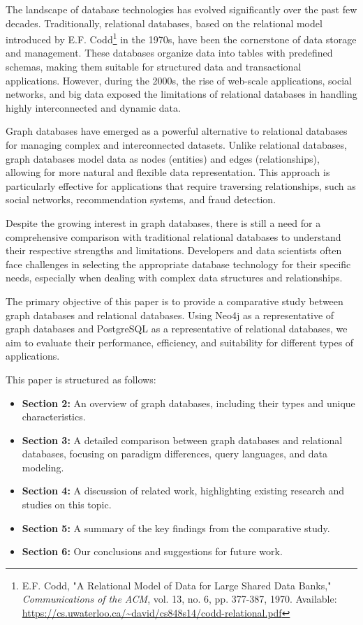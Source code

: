 The landscape of database technologies has evolved significantly over the past few decades. Traditionally, relational databases, based on the relational model introduced by E.F. Codd\footnote{E.F. Codd, "A Relational Model of Data for Large Shared Data Banks," \textit{Communications of the ACM}, vol. 13, no. 6, pp. 377-387, 1970. Available: \url{https://cs.uwaterloo.ca/~david/cs848s14/codd-relational.pdf}} in the 1970s, have been the cornerstone of data storage and management. These databases organize data into tables with predefined schemas, making them suitable for structured data and transactional applications. However, during the 2000s, the rise of web-scale applications, social networks, and big data exposed the limitations of relational databases in handling highly interconnected and dynamic data.

Graph databases have emerged as a powerful alternative to relational databases for managing complex and interconnected datasets. Unlike relational databases, graph databases model data as nodes (entities) and edges (relationships), allowing for more natural and flexible data representation. This approach is particularly effective for applications that require traversing relationships, such as social networks, recommendation systems, and fraud detection.

Despite the growing interest in graph databases, there is still a need for a comprehensive comparison with traditional relational databases to understand their respective strengths and limitations. Developers and data scientists often face challenges in selecting the appropriate database technology for their specific needs, especially when dealing with complex data structures and relationships.

The primary objective of this paper is to provide a comparative study between graph databases and relational databases. Using Neo4j as a representative of graph databases and PostgreSQL as a representative of relational databases, we aim to evaluate their performance, efficiency, and suitability for different types of applications.


This paper is structured as follows:
\begin{itemize}
    \item \textbf{Section 2:} An overview of graph databases, including their types and unique characteristics.
    \item \textbf{Section 3:} A detailed comparison between graph databases and relational databases, focusing on paradigm differences, query languages, and data modeling.
    \item \textbf{Section 4:} A discussion of related work, highlighting existing research and studies on this topic.
    \item \textbf{Section 5:} A summary of the key findings from the comparative study.
    \item \textbf{Section 6:} Our conclusions and suggestions for future work.
\end{itemize}
